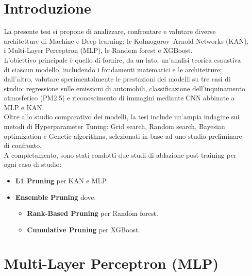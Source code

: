 \documentclass[a4paper,12pt]{report}
\begin{document}
	\chapter*{Introduzione}
	La presente tesi si propone di analizzare, confrontare e valutare diverse architetture di Machine e Deep learning: le Kolmogorov–Arnold Networks (KAN), i Multi-Layer Perceptron (MLP), le Random forest e XGBoost. \\
	L’obiettivo principale è quello di fornire, da un lato, un’analisi teorica esaustiva di ciascun modello, includendo i fondamenti matematici e le architetture; dall’altro, valutare sperimentalmente le prestazioni dei modelli su tre casi di studio: regressione sulle emissioni di automobili, classificazione dell’inquinamento atmosferico (PM2.5) e riconoscimento di immagini mediante CNN abbinate a MLP e KAN. \\
	Oltre allo studio comparativo dei modelli, la tesi include un’ampia indagine sui metodi di Hyperparameter Tuning: Grid search, Random search, Bayesian optimization e Genetic algorithms, selezionati in base ad uno studio preliminare di confronto. \\
	A completamento, sono stati condotti due studi di ablazione post-training per ogni caso di studio:
	\begin{itemize}
		\item \textbf{L1 Pruning} per KAN e MLP.
		\item \textbf{Ensemble Pruning} dove:
		\begin{itemize}
			\item \textbf{Rank-Based Pruning} per Random forest.
			\item \textbf{Cumulative Pruning} per XGBoost.
		\end{itemize}
	\end{itemize}
	
	\chapter{Multi-Layer Perceptron (MLP)}
	
\end{document}
